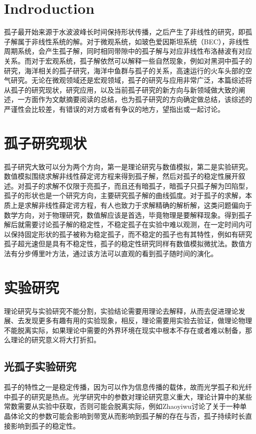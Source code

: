 \documentclass{article}
\begin{document}
\begin{multicols}{2}
\section{Indroduction}
孤子最开始来源于水波波峰长时间保持形状传播，之后产生了非线性的研究，即孤子解属于非线性系统的解。对于微观系统，如玻色爱因斯坦系统（BEC），非线性周期系统，会产生孤子解，同时相同带隙中的孤子解与对应非线性布洛赫波有对应关系\cite{Zhang.2009}。而对于宏观系统，孤子解依然可以解释一些自然现象，例如对黑洞中孤子的研究\cite{dymnikova2020regular}，海洋相关的孤子研究\cite{stepanyants2020nonlinear,zhao2019the}，海洋中鱼群与孤子的关系\cite{soliton_russion}，高速运行的火车头部的空气研究\cite{soliton_russion}。无论在微观领域还是宏观领域，孤子的研究与应用非常广泛，本篇综述将从孤子的研究现状，研究应用，以及当前孤子研究的新方向与新领域做大致的阐述，一方面作为文献摘要阅读的总结，也为孤子研究的方向确定做总结，该综述的严谨性会比较差，有错误的对方或者有争议的地方，望指出或一起讨论。

\section{孤子研究现状}
孤子研究大致可以分为两个方向，第一是理论研究与数值模拟，第二是实验研究。数值模拟围绕求解非线性薛定谔方程来得到孤子解，然后对孤子的稳定性展开叙述。对孤子的求解不仅限于亮孤子，而且还有暗孤子\cite{article,2017Decay}，暗孤子只孤子解为凹陷型，孤子的形状也是一个研究方向，主要研究孤子解的曲线弧度\cite{Umbetova_2019}。对于孤子的求解，本质上是求解非线性薛定谔方程\cite{soliton_russion2}，有人也致力于求解精确的解析解\cite{2020Exact,inproceedings}，这类问题偏向于数学方向，对于物理研究，数值解应该是首选，毕竟物理是要解释现象。得到孤子解后就需要讨论孤子解的稳定性，不稳定孤子在实验中难以观测，在一定时间内可以保持固定形状的孤子被称为稳定孤子，而不稳定的孤子也有其特性，例如有研究孤子超光速但是具有不稳定性\cite{1937-1632_2020_8_2285}，孤子的稳定性研究同样有数值模拟微扰法\cite{article_stable}。数值方法有分步傅里叶方法\cite{article_step}，通过该方法可以直观的看到孤子随时间的演化。
\section{实验研究}
理论研究与实验研究不能分割，实验结论需要用理论去解释，从而去促进理论发展、去发现更多有趣有用的实验现象，相反，理论需要用实验去验证，做理论物理不能脱离实际，如果理论中需要的外界环境在现实中根本不存在或者难以制备，那么理论的研究意义将大打折扣。
\subsection{光孤子实验研究}
孤子的特性之一是稳定传播，因为可以作为信息传播的载体，故而光学孤子\cite{mariana2020latest,kulakovskii2019coherence}和光纤中孤子\cite{article_step,morin2020sub,chen2020toward,mayteevarunyoo2020spatiotemporal}的研究是热点。光学研究中的参数对理论研究意义重大，理论计算中的某些常数需要从实验中获取，否则可能会脱离实际，例如Zhaoyiwu讨论了关于一种单晶体\cite{zhao2020generation}论文的参数可能会影响到带宽从而影响到孤子解的存在与否，孤子持续时长直接影响到孤子的稳定性。

\end{multicols}
\end{document}
